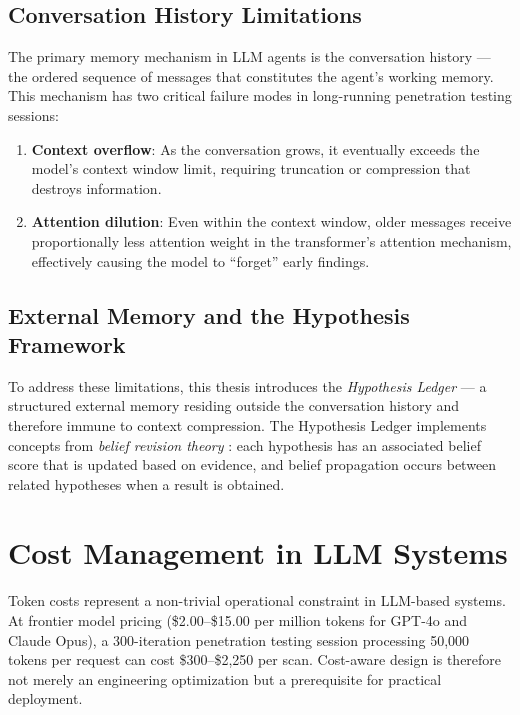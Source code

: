 \documentclass[12pt,a4paper,oneside,openany]{book}
\newcommand{\term}[1]{\textit{#1}}
\begin{document}
\subsection{Conversation History Limitations}

The primary memory mechanism in LLM agents is the conversation history — the ordered sequence of messages that constitutes the agent's working memory. This mechanism has two critical failure modes in long-running penetration testing sessions:

\begin{enumerate}
\item \textbf{Context overflow}: As the conversation grows, it eventually exceeds the model's context window limit, requiring truncation or compression that destroys information.
\item \textbf{Attention dilution}: Even within the context window, older messages receive proportionally less attention weight in the transformer's attention mechanism, effectively causing the model to ``forget'' early findings.
\end{enumerate}

\subsection{External Memory and the Hypothesis Framework}

To address these limitations, this thesis introduces the \term{Hypothesis Ledger} — a structured external memory residing outside the conversation history and therefore immune to context compression. The Hypothesis Ledger implements concepts from \term{belief revision theory} \cite{alchourron1985logic}: each hypothesis has an associated belief score that is updated based on evidence, and belief propagation occurs between related hypotheses when a result is obtained.

\section{Cost Management in LLM Systems}

Token costs represent a non-trivial operational constraint in LLM-based systems. At frontier model pricing (\$2.00--\$15.00 per million tokens for GPT-4o and Claude Opus), a 300-iteration penetration testing session processing 50,000 tokens per request can cost \$300--\$2,250 per scan. Cost-aware design is therefore not merely an engineering optimization but a prerequisite for practical deployment.
\end{document}
